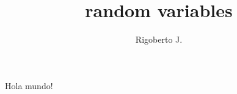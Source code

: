 \documentclass{article}
\title{random variables}
\author{Rigoberto J.}
\date{}
\begin{document}
\maketitle

Hola mundo!
\end{document}
